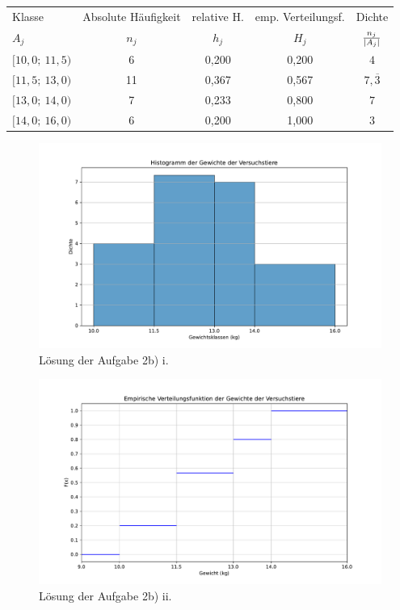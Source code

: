 \documentclass[main.tex]{subfiles}
\begin{document}
\begin{center}
\begin{tabular}{l|c|c|c|c}
Klasse & Absolute Häufigkeit & relative H.   & emp. Verteilungsf.       & Dichte\\
$A_j$  & $n_j$               & $h_j$         & $H_j$                    & $\frac{n_j}{\lvert A_j\rvert}$ \\\hline
$[10,0;\  11,5)$  & 6                   & 0,200               & 0,200   &  $4$              \\
$[11,5;\  13,0)$  & 11                  & 0,367               & 0,567   &  $7,\overline{3}$ \\
$[13,0;\  14,0)$  & 7                   & 0,233               & 0,800   &  $7$              \\
$[14,0;\  16,0)$  & 6                   & 0,200               & 1,000   &  $3$              \\
\end{tabular}
\end{center}

\begin{figure}[h!]
    \begin{center}
        \includegraphics[width=1\textwidth]{A2-b.pdf}
        \caption{Lösung der Aufgabe 2b) i.}
    \end{center}
\end{figure}

\begin{figure}[h!]
    \begin{center}
        \includegraphics[width=1\textwidth]{A2-b2.pdf}
        \caption{Lösung der Aufgabe 2b) ii.}
    \end{center}
\end{figure}
\end{document}
